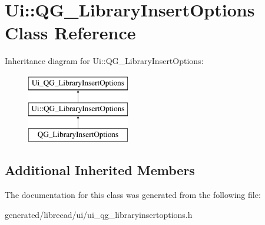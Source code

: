 \hypertarget{classUi_1_1QG__LibraryInsertOptions}{\section{Ui\-:\-:Q\-G\-\_\-\-Library\-Insert\-Options Class Reference}
\label{classUi_1_1QG__LibraryInsertOptions}
}
Inheritance diagram for Ui\-:\-:Q\-G\-\_\-\-Library\-Insert\-Options\-:\begin{figure}[H]
\begin{center}
\leavevmode
\includegraphics[height=3.000000cm]{classUi_1_1QG__LibraryInsertOptions}
\end{center}
\end{figure}
\subsection*{Additional Inherited Members}


The documentation for this class was generated from the following file\-:\begin{DoxyCompactItemize}
\item 
generated/librecad/ui/ui\-\_\-qg\-\_\-libraryinsertoptions.\-h\end{DoxyCompactItemize}
